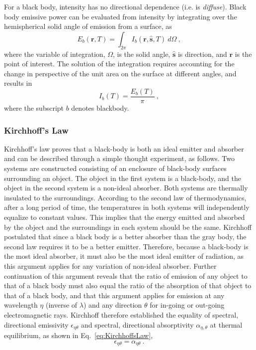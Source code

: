 For a black body, intensity has no directional dependence (i.e. is \textit{diffuse}). Black body emissive power can be evaluated from intensity by integrating over the hemispherical solid angle of emission from a surface, as 
\begin{equation}
    E_b(\textbf{r},T) = \int_{2\pi}{I_b(\textbf{r},\hat{\textbf{s}},T)}~d\Omega{}\ ,
    \label{eq:EmissivePowerFromIntensity}
\end{equation}
where the variable of integration, $\Omega{}$, is the solid angle, $\hat{\textbf{s}}$ is direction, and $\textbf{r}$ is the point of interest. The solution of the integration requires accounting for the change in perspective of the unit area on the surface at different angles, and results in
\begin{equation}
    I_b(T) = \frac{E_b(T)}{\pi}\ ,
    \label{eq:Intensity}
\end{equation}
where the subscript $b$ denotes blackbody. 

\subsubsection{Kirchhoff's Law} \label{sec:KirchoffsLaw}
Kirchhoff's law proves that a black-body is both an ideal emitter and absorber and can be described through a simple thought experiment, as follows. Two systems are constructed consisting of an enclosure of black-body surfaces surrounding an object. The object in the first system is a black-body, and the object in the second system is a non-ideal absorber. Both systems are thermally insulated to the surroundings. 
According to the second law of thermodynamics, after a long period of time, the temperatures in both systems will independently equalize to constant values. This implies that the energy emitted and absorbed by the object and the surroundings in each system should be the same.
Kirchhoff postulated that since a black body is a better absorber than the gray body, the second law requires it to be a better emitter. Therefore, because a black-body is the most ideal absorber, it must also be the most ideal emitter of radiation, as this argument applies for any variation of non-ideal absorber.
Further continuation of this argument reveals that the ratio of emission of any object to that of a black body must also equal the ratio of the absorption of that object to that of a black body, and that this argument applies for emission at any wavelength $\eta$ (inverse of $\lambda$) and any direction $\theta$ for in-going or out-going electromagnetic rays. Kirchhoff therefore established the equality of spectral, directional emissivity $\epsilon_{\eta{}\theta{}}$ and spectral, directional absorptivity $\alpha{}_{\eta,\theta}$ at thermal equilibrium, as shown in Eq.~\ref{eq:KirchhoffsLaw},
\begin{equation}
    \epsilon{}_{\eta{}\theta{}}=\alpha{}_{\eta{}\theta{}}\ .
    \label{eq:KirchhoffsLaw}
\end{equation}

